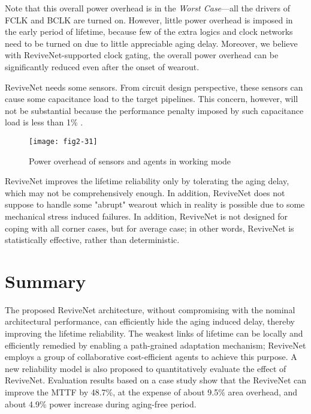 Note that this overall power overhead is in the \emph{Worst Case}---all the drivers of FCLK and BCLK
are turned on. However, little power overhead is imposed in the early period of lifetime, because
few of the extra logics and clock networks need to be turned on due to  little appreciable aging
delay. Moreover, we believe with ReviveNet-supported clock gating, the overall power
overhead can be significantly reduced even after the onset of wearout.



\smallskip {}

ReviveNet needs some sensors. From circuit design perspective, these sensors can cause some
capacitance load to the target pipelines. This concern, however, will not be substantial because
the performance penalty imposed by such capacitance load is less than 1\%
\cite{agarwal2007circuit}\cite{SVFD_09}.


\begin{figure}[t]
\centering
\texttt{[image: fig2-31]}%
\vspace{-0.3cm}
   \caption{Power overhead of sensors and agents in working mode}\label{logicpower}
\end{figure}

ReviveNet improves the lifetime reliability only by tolerating the aging delay, which may not be
comprehensively enough. In addition, ReviveNet does not suppose to handle some "abrupt" wearout
which in reality is possible due to some mechanical stress induced failures.
In addition, ReviveNet is not designed for coping with all corner cases, but for average case;
in other words, ReviveNet is statistically effective, rather than deterministic.

\section{Summary}
The proposed ReviveNet architecture, without compromising with the nominal architectural
performance, can efficiently hide the aging induced delay, thereby improving the lifetime
reliability. The weakest links of lifetime can be locally and efficiently remedied by enabling a
path-grained adaptation mechanism; ReviveNet employs a group of collaborative cost-efficient agents
to achieve this purpose. A new reliability model is also proposed to quantitatively evaluate the
effect of ReviveNet. Evaluation results based on a case study show that the ReviveNet can improve
the MTTF by 48.7\%, at the expense of about 9.5\% area overhead, and about 4.9\% power increase during aging-free period.



